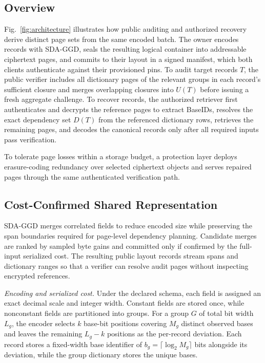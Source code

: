 \documentclass[10pt,journal]{IEEEtran}
\begin{document}
\subsection{Overview}
Fig.~\ref{fig:architecture} illustrates how public auditing and authorized recovery derive distinct page sets from the same encoded batch. The owner encodes records with SDA-GGD, seals the resulting logical container into addressable ciphertext pages, and commits to their layout in a signed manifest, which both clients authenticate against their provisioned pins. To audit target records $T$, the public verifier includes all dictionary pages of the relevant groups in each record's sufficient closure and merges overlapping closures into $U(T)$ before issuing a fresh aggregate challenge. To recover records, the authorized retriever first authenticates and decrypts the reference pages to extract BaseIDs, resolves the exact dependency set $D(T)$ from the referenced dictionary rows, retrieves the remaining pages, and decodes the canonical records only after all required inputs pass verification.

To tolerate page losses within a storage budget, a protection layer deploys erasure-coding redundancy over selected ciphertext objects and serves repaired pages through the same authenticated verification path.

\subsection{Cost-Confirmed Shared Representation}\label{sec:c1}
SDA-GGD merges correlated fields to reduce encoded size while preserving the span boundaries required for page-level dependency planning. Candidate merges are ranked by sampled byte gains and committed only if confirmed by the full-input serialized cost. The resulting public layout records stream spans and dictionary ranges so that a verifier can resolve audit pages without inspecting encrypted references.

\emph{Encoding and serialized cost.}
Under the declared schema, each field is assigned an exact decimal scale and integer width. Constant fields are stored once, while nonconstant fields are partitioned into groups. For a group $G$ of total bit width $L_g$, the encoder selects $k$ base-bit positions covering $M_g$ distinct observed bases and leaves the remaining $L_g-k$ positions as the per-record deviation. Each record stores a fixed-width base identifier of $b_g=\lceil\log_2 M_g\rceil$ bits alongside its deviation, while the group dictionary stores the unique bases.
\end{document}
